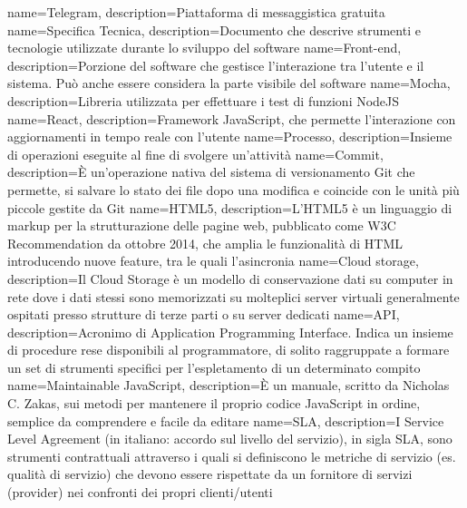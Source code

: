  {
	name=Telegram,
	description={Piattaforma di messaggistica gratuita}
}
 {
	name=Specifica Tecnica,
	description={Documento che descrive strumenti e tecnologie utilizzate durante lo sviluppo del software}
}
 {
	name=Front-end,
	description={Porzione del software che gestisce l'interazione tra l'utente e il sistema. Può anche essere considera la parte visibile del software}
}
 {
	name=Mocha,
	description={Libreria utilizzata per effettuare i test di funzioni NodeJS}
}
 {
	name=React,
	description={Framework JavaScript, che permette l'interazione con aggiornamenti in tempo reale con l'utente}
}
 {
	name=Processo,
	description={Insieme di operazioni eseguite al fine di svolgere un'attività}
}
 {
	name=Commit,
	description={È un'operazione nativa del sistema di versionamento Git che permette, si salvare lo stato dei file dopo una modifica e coincide con le unità più piccole gestite da Git}
}
 {
	name=HTML5,
	description={L'HTML5 è un linguaggio di markup per la strutturazione delle pagine web, pubblicato come W3C Recommendation da ottobre 2014, che amplia le funzionalità di HTML introducendo nuove feature, tra le quali l'asincronia}
}
 {
	name=Cloud storage,
	description={Il Cloud Storage è un modello di conservazione dati su computer in rete dove i dati stessi sono memorizzati su molteplici server virtuali generalmente ospitati presso strutture di terze parti o su server dedicati}
}
 {
	name=API,
	description={Acronimo di Application Programming Interface. Indica un insieme di procedure rese disponibili al programmatore, di solito raggruppate a formare un set di strumenti specifici per l'espletamento di un determinato compito}
}
 {
	name=Maintainable JavaScript,
	description={È un manuale, scritto da Nicholas C. Zakas, sui metodi per mantenere il proprio codice JavaScript in ordine, semplice da comprendere e facile da editare}
}
 {
	name=SLA,
	description={I Service Level Agreement (in italiano: accordo sul livello del servizio), in sigla SLA, sono strumenti contrattuali attraverso i quali si definiscono le metriche di servizio (es. qualità di servizio) che devono essere rispettate da un fornitore di servizi (provider) nei confronti dei propri clienti/utenti}
}
